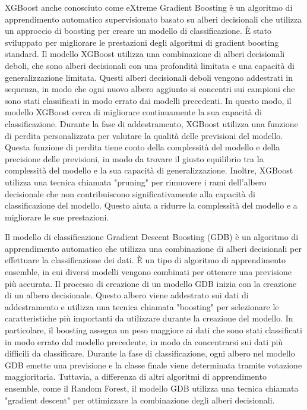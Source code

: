 \documentclass[italian,12pt,a4paper]{article}
\begin{document}
    XGBoost anche conosciuto come eXtreme Gradient Boosting è un algoritmo di apprendimento automatico supervisionato basato su alberi decisionali che utilizza un approccio di boosting per creare un modello di classificazione. È stato sviluppato per migliorare le prestazioni degli algoritmi di gradient boosting standard. Il modello XGBoost utilizza una combinazione di alberi decisionali deboli, che sono alberi decisionali con una profondità limitata e una capacità di generalizzazione limitata. Questi alberi decisionali deboli vengono addestrati in sequenza, in modo che ogni nuovo albero aggiunto si concentri sui campioni che sono stati classificati in modo errato dai modelli precedenti. In questo modo, il modello XGBoost cerca di migliorare continuamente la sua capacità di classificazione. Durante la fase di addestramento, XGBoost utilizza una funzione di perdita personalizzata per valutare la qualità delle previsioni del modello. Questa funzione di perdita tiene conto della complessità del modello e della precisione delle previsioni, in modo da trovare il giusto equilibrio tra la complessità del modello e la sua capacità di generalizzazione. Inoltre, XGBoost utilizza una tecnica chiamata "pruning" per rimuovere i rami dell'albero decisionale che non contribuiscono significativamente alla capacità di classificazione del modello. Questo aiuta a ridurre la complessità del modello e a migliorare le sue prestazioni.
    \\
    \vspace{25pt}

    Il modello di classificazione Gradient Descent Boosting (GDB) è un algoritmo di apprendimento automatico che utilizza una combinazione di alberi decisionali per effettuare la classificazione dei dati. È un tipo di algoritmo di apprendimento ensemble, in cui diversi modelli vengono combinati per ottenere una previsione più accurata. Il processo di creazione di un modello GDB inizia con la creazione di un albero decisionale. Questo albero viene addestrato sui dati di addestramento e utilizza una tecnica chiamata "boosting" per selezionare le caratteristiche più importanti da utilizzare durante la creazione del modello. In particolare, il boosting assegna un peso maggiore ai dati che sono stati classificati in modo errato dal modello precedente, in modo da concentrarsi sui dati più difficili da classificare. Durante la fase di classificazione, ogni albero nel modello GDB emette una previsione e la classe finale viene determinata tramite votazione maggioritaria. Tuttavia, a differenza di altri algoritmi di apprendimento ensemble, come il Random Forest, il modello GDB utilizza una tecnica chiamata "gradient descent" per ottimizzare la combinazione degli alberi decisionali.
    \\
    \vspace{25pt}
    
\end{document}
